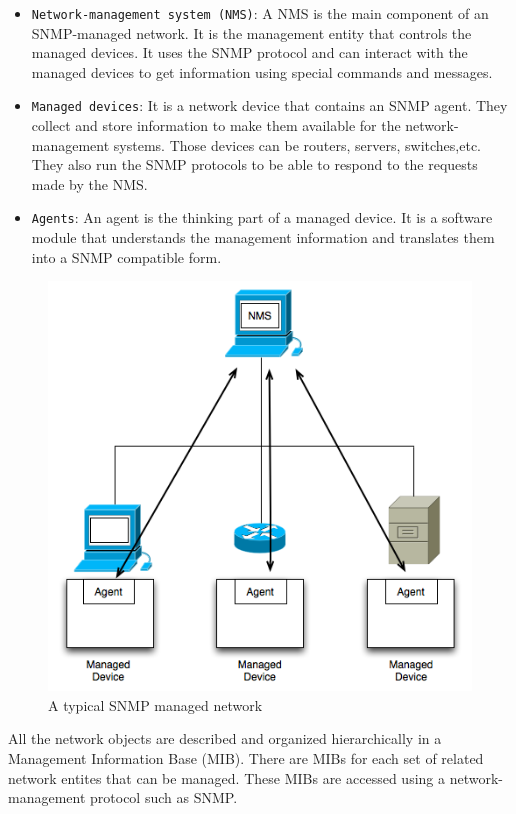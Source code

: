 \begin{itemize}
	\item \texttt{Network-management system (NMS)}: A NMS is the main component of an SNMP-managed network. It is the management entity that controls the managed devices. It uses the SNMP protocol and can interact with the managed devices to get information using special commands and messages.
	
	\item \texttt{Managed devices}: It is a network device that contains an SNMP agent. They collect and store information to make them available for the network-management systems. Those devices can be routers, servers, switches,etc. They also run the SNMP protocols to be able to respond to the requests made by the NMS.
	
	\item \texttt{Agents}: An agent is the thinking part of a managed device. It is a software module that understands the management information and translates them into a SNMP compatible form.
\end{itemize}

\begin{figure}[H]
\centering
	\includegraphics[width=.7\linewidth]{Pictures/Chapter3/snmp.png}
	\caption{A typical SNMP managed network}
\end{figure}

All the network objects are described and organized hierarchically in a Management Information Base (MIB). There are MIBs for each set of related network entites that can be managed. These MIBs are accessed using a network-management protocol such as SNMP.

